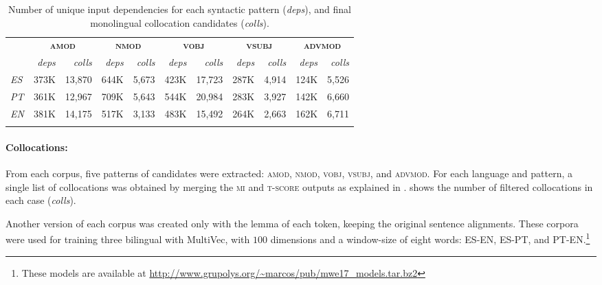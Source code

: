 \documentclass[output=paper,modfonts,nonflat]{langsci/langscibook}
\begin{document}
\begin{table}
  \begin{center}
    {\small{
        \caption{\label{tab:mono} Number of unique input dependencies for each syntactic pattern (\emph{deps}),
          and final monolingual collocation candidates (\emph{colls}).}
    \begin{tabular}{lrrrrrrrrrr}
      \lsptoprule
      \textbf{\multirow{2}{*}{Lg}} & \multicolumn{2}{c}{\textbf{\textsc{amod}}} & \multicolumn{2}{c}{\textbf{\textsc{nmod}}} & \multicolumn{2}{c}{\textbf{\textsc{vobj}}} & \multicolumn{2}{c}{\textbf{\textsc{vsubj}}} & \multicolumn{2}{c}{\textbf{\textsc{advmod}}} \\
      & \emph{deps} & \emph{colls} & \emph{deps} & \emph{colls} & \emph{deps} & \emph{colls} & \emph{deps} & \emph{colls} & \emph{deps} & \emph{colls}\\
      \midrule
      \emph{ES}   & 373K & 13,870   & 644K & 5,673   & 423K & 17,723 & 287K & 4,914 & 124K & 5,526 \\
      \emph{PT}   & 361K & 12,967   & 709K & 5,643   & 544K & 20,984 & 283K & 3,927 & 142K & 6,660 \\
      \emph{EN}   & 381K & 14,175   & 517K & 3,133   & 483K & 15,492 & 264K & 2,663 & 162K & 6,711 \\
      \lspbottomrule
    \end{tabular}
    }}
  \end{center}
\end{table}

\paragraph*{Collocations:} From each corpus, five patterns of  candidates
were extracted: \textsc{amod}, \textsc{nmod}, \textsc{vobj}, \textsc{vsubj}, and \textsc{advmod}.
For each language and pattern, a single list of collocations was obtained by merging the \textsc{mi}
and \textsc{t-score} outputs as explained in . 
shows the number of filtered collocations in each case (\emph{colls}).

Another version of each corpus was created only with the lemma of each token,
keeping the original sentence alignments. These corpora were used for training
three bilingual  with MultiVec, with $100$ dimensions and
a window-size of eight words: ES-EN, ES-PT, and PT-EN.\footnote{These models are available at \scriptsize{\url{http://www.grupolys.org/~marcos/pub/mwe17_models.tar.bz2}}}
\end{document}
